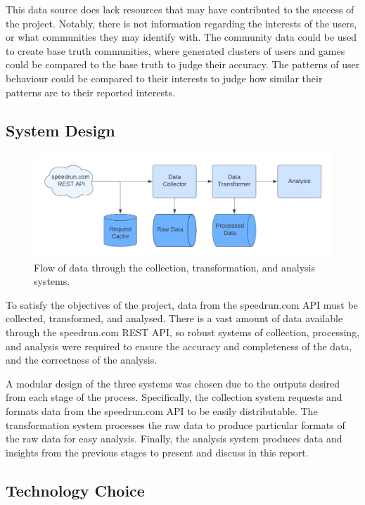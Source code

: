 This data source does lack resources that may have contributed to the success of the project. Notably, there is not information regarding the interests of the users, or what communities they may identify with. The community data could be used to create base truth communities, where generated clusters of users and games could be compared to the base truth to judge their accuracy. The patterns of user behaviour could be compared to their interests to judge how similar their patterns are to their reported interests. 

\subsection{System Design}

\vspace{-20pt}
\begin{figure}[h]
    \centering
    \includegraphics[width=0.8\linewidth]{images/data-pipeline.png}
    \caption{Flow of data through the collection, transformation, and analysis systems.}
    \label{fig:my_label}
\end{figure}

To satisfy the objectives of the project, data from the speedrun.com API must be collected, transformed, and analysed. There is a vast amount of data available through the speedrun.com REST API, so robust systems of collection, processing, and analysis were required to ensure the accuracy and completeness of the data, and the correctness of the analysis. 


A modular design of the three systems was chosen due to the outputs desired from each stage of the process. Specifically, the collection system requests and formats data from the speedrun.com API to be easily distributable. The transformation system processes the raw data to produce particular formats of the raw data for easy analysis. Finally, the analysis system produces data and insights from the previous stages to present and discuss in this report.

\subsection{Technology Choice}

